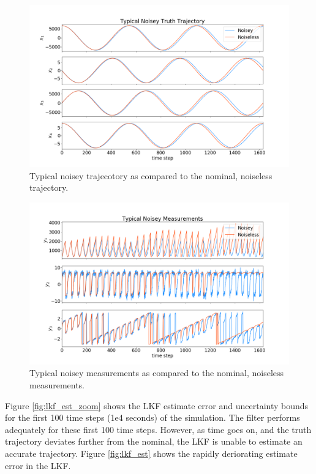 \documentclass[11pt, a4paper]{article}
\begin{document}
\begin{figure}[H]
	\centering
	\includegraphics[width=\textwidth]{Figures/noisey_truth.png}
	\caption{Typical noisey trajecotory as compared to the nominal, noiseless trajectory.}
	\label{fig:noisey_states}
\end{figure}

\begin{figure}[H]
	\centering
	\includegraphics[width=\textwidth]{Figures/noisey_meas.png}
	\caption{Typical noisey measurements as compared to the nominal, noiseless measurements.}
	\label{fig:noisey_meas}
\end{figure}

Figure \ref{fig:lkf_est_zoom} shows the LKF estimate error and uncertainty bounds for the first 100 time steps (1e4 seconds) of the simulation. 
The filter performs adequately for these first 100 time steps.
However, as time goes on, and the truth trajectory deviates further from the nominal, the LKF is unable to estimate an accurate trajectory. 
Figure \ref{fig:lkf_est} shows the rapidly deriorating estimate error in the LKF.  
\end{document}
